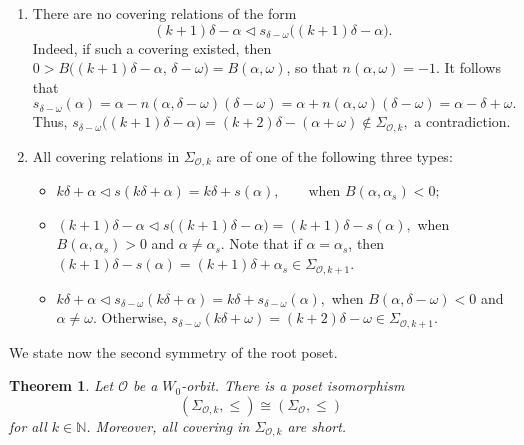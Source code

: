 \documentclass{amsart}
\newtheorem{Theorem}{Theorem}[section]
\theoremstyle{definition}
\newcommand{\mo}{\mathcal{O}}
\begin{document}
\begin{enumerate}
\item[(1)]
There are no covering relations of the form
\[
(k+1)\delta - \alpha \lhd s_{\delta-\omega}\big((k+1)\delta - \alpha\big).
\]
Indeed, if such a covering existed, then
$0 > B\big((k+1)\delta - \alpha,\, \delta - \omega\big) = B(\alpha,\omega)$,
so that $n(\alpha,\omega) = -1$. It follows that
\[
s_{\delta-\omega}(\alpha)
= \alpha - n(\alpha,\delta-\omega)(\delta-\omega)
= \alpha + n(\alpha,\omega)(\delta-\omega)
= \alpha - \delta + \omega.
\]
Thus, $s_{\delta-\omega}\big((k+1)\delta - \alpha\big)
= (k+2)\delta - (\alpha + \omega)
\notin \Sigma_{\mo,k},$ a contradiction.
\smallskip

\item[(2)]
All covering relations in $\Sigma_{\mo,k}$ are of one of the following three types:
\begin{itemize}
\item[(i)]
$k\delta + \alpha \lhd s(k\delta + \alpha) = k\delta + s(\alpha),
\qquad \text{when } B(\alpha,\alpha_s) < 0;
$

\item[(ii)]
$
(k+1)\delta - \alpha \lhd s\big((k+1)\delta - \alpha\big)
= (k+1)\delta - s(\alpha),
$
when $B(\alpha,\alpha_s) > 0$ and $\alpha \neq \alpha_s$.
Note that if $\alpha = \alpha_s$, then
$(k+1)\delta - s(\alpha) = (k+1)\delta + \alpha_s \in \Sigma_{\mo,k+1}$.

\item[(iii)]
$
k\delta + \alpha \lhd s_{\delta-\omega}(k\delta + \alpha)
= k\delta + s_{\delta-\omega}(\alpha),
$
when $B(\alpha,\delta-\omega) < 0$ and $\alpha \neq \omega$.
Otherwise, $s_{\delta-\omega}(k\delta + \omega) = (k+2)\delta - \omega
\in \Sigma_{\mo,k+1}.$
\end{itemize}
\end{enumerate}


We state now the second symmetry of the root poset.

\begin{Theorem}\label{th:iso2} Let $\mo$ be a $W_0$-orbit. There is a poset isomorphism $$(\Sigma_{\mo,k}, \leq) \cong (\Sigma_{\mo}, \leq)$$ for all $k\in\mathbb{N}$. Moreover, all covering in $\Sigma_{\mo,k}$ are short.
\end{Theorem}
\end{document}
